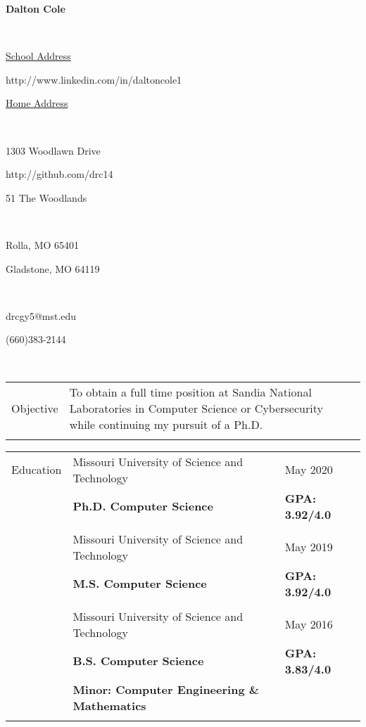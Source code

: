 \documentclass[10.5pt, arial]{article}
\newcommand\textbox[1]{%
  \parbox{.333\textwidth}{#1}%
}
\begin{document}

\noindent\textbox{\hfill}\textbox{\hfil \textbf{Dalton Cole}\hfil}\textbox{\hfill} \\
\noindent\textbox{\underline{School Address}\hfill}\textbox{\hfil http://www.linkedin.com/in/daltoncole1\hfil}\textbox{\hfill \underline{Home Address}} \\
\noindent\textbox{1303 Woodlawn Drive\hfill}\textbox{\hfil http://github.com/drc14\hfil}\textbox{\hfill 51 The Woodlands} \\
\noindent\textbox{Rolla, MO 65401\hfill}\textbox{\hfil \hfil}\textbox{\hfill Gladstone, MO 64119} \\
\noindent\textbox{drcgy5@mst.edu\hfill}\textbox{\hfil \hfil}\textbox{\hfill (660)383-2144} \\
\noindent\makebox[\linewidth]{\rule{\textwidth}{.4pt}} 

\begin{tabular}{p{1.5cm} p{13.2cm} l}
Objective  	& To obtain a full time position at Sandia National Laboratories in Computer Science or Cybersecurity while continuing my pursuit of a Ph.D. & 						\\ \\
\end{tabular}

\begin{tabular}{p{1.5cm} p{13.2cm} l}
Education  	& Missouri University of Science and Technology 					& May 2020 				\\
			& \textbf{Ph.D. Computer Science} 									& \textbf{GPA: 3.92/4.0}	\\ \\

			& Missouri University of Science and Technology 					& May 2019 				\\
			& \textbf{M.S. Computer Science}								& \textbf{GPA: 3.92/4.0}	\\ \\

		  	& Missouri University of Science and Technology 					& May 2016 				\\
			& \textbf{B.S. Computer Science} 									& \textbf{GPA: 3.83/4.0} \\
			& \textbf{Minor: Computer Engineering \& Mathematics} 										\\ \\
\end{tabular}
\end{document}
